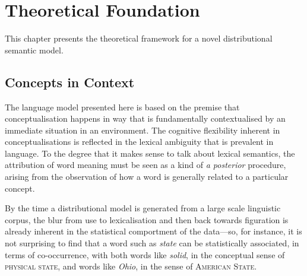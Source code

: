 \chapter{Theoretical Foundation}
This chapter presents the theoretical framework for a novel distributional semantic model.

\section{Concepts in Context}
The language model presented here is based on the premise that conceptualisation happens in way that is fundamentally contextualised by an immediate situation in an environment.  The cognitive flexibility inherent in conceptualisations is reflected in the lexical ambiguity that is prevalent in language.  To the degree that it makes sense to talk about lexical semantics, the attribution of word meaning must be seen as a kind of \emph{a posterior} procedure, arising from the observation of how a word is generally related to a particular concept.

By the time a distributional model is generated from a large scale linguistic corpus, the blur from use to lexicalisation and then back towards figuration is already inherent in the statistical comportment of the data---so, for instance, it is not surprising to find that a word such as \emph{state} can be statistically associated, in terms of co-occurrence, with both words like \emph{solid}, in the conceptual sense of \textsc{physical state}, and words like \emph{Ohio}, in the sense of \textsc{American State}.

